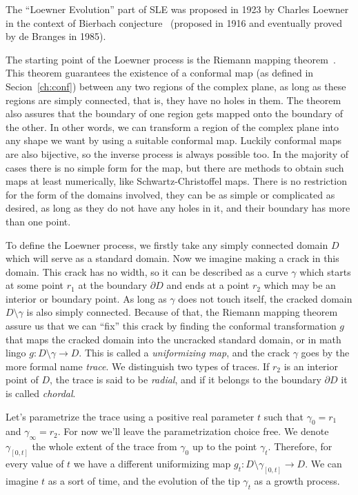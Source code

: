 The ``Loewner Evolution'' part of SLE was proposed in 1923 by Charles Loewner
in the context of Bierbach conjecture~\cite{Loewner1923} (proposed in 1916 and
eventually proved by de Branges in 1985). 

The starting point of the Loewner process is the Riemann mapping
theorem~\cite{Ahlfors1979}. This theorem guarantees the existence of a
conformal map (as defined in Secion~\ref{ch:conf}) between any two regions of
the complex plane, as long as these regions are simply connected, that is, they
have no holes in them. The theorem also assures that the boundary of one region
gets mapped onto the boundary of the other. In other words, we can transform a
region of the complex plane into any shape we want by using a suitable
conformal map. Luckily conformal maps are also bijective, so the inverse
process is always possible too. In the majority of cases there is no simple
form for the map, but there are methods to obtain such maps at least
numerically, like Schwartz-Christoffel maps. There is no restriction for the
form of the domains involved, they can be as simple or complicated as desired,
as long as they do not have any holes in it, and their boundary has more than
one point.

To define the Loewner process, we firstly take any simply connected domain $D$
which will serve as a standard domain. Now we imagine making a crack in this
domain. This crack has no width, so it can be described as a curve $\gamma$
which starts at some point $r_1$ at the boundary $\partial D$ and ends at a
point $r_2$ which may be an interior or boundary point. As long as $\gamma$
does not touch itself, the cracked domain $D\setminus\gamma$ is also simply
connected. Because of that, the Riemann mapping theorem assure us that we can
``fix'' this crack by finding the conformal transformation $g$ that maps the
cracked domain into the uncracked standard domain, or in math lingo
$g:D\setminus\gamma\rightarrow D$. This is called a \textit{uniformizing map},
and the crack  $\gamma$ goes by the more formal name \textit{trace}. We
distinguish two types of traces. If $r_2$ is an interior point of $D$, the
trace is said to be \textit{radial}, and if it belongs to the boundary
$\partial D$ it is called \textit{chordal}.

Let's parametrize the trace using a positive real parameter $t$ such that
$\gamma_{0}=r_1$ and $\gamma_{\infty}=r_2$. For now we'll leave the
parametrization choice free. We denote $\gamma_{[0,t]}$ the whole extent of the
trace from $\gamma_0$ up to the point $\gamma_t$. Therefore, for every value of
$t$ we have a different uniformizing map
$g_t:D\setminus\gamma_{[0,t]}\rightarrow D$. We can imagine $t$ as a sort of
time, and the evolution of the tip $\gamma_t$ as a growth process.


